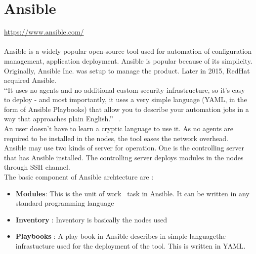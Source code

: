 \section{Ansible}
\url{ https://www.ansible.com/ } \\
\\
Ansible is a widely popular open-source tool used for automation of configuration management,
application deployment. Ansible is popular because of its simplicity. Originally, Ansible Inc.
was setup to manage the product. Later in 2015, RedHat acquired Ansible.\\
‘‘It uses no agents and no additional custom security infrastructure, so it’s easy to deploy - 
and most importantly, it uses a very simple language (YAML, in the form of Ansible Playbooks) 
that allow you to describe your automation jobs in a way that approaches plain English.’’
~\cite {hid-sp18-417-doc-Ansible}. \\
An user doesn’t have to learn a cryptic language to use it. 
As no agents are required to be installed in the nodes, the tool eases the network overhead. \\
Ansible may use two kinds of server for operation. One is the controlling server that has Ansible installed.
The controlling server deploys modules in the nodes through SSH channel. \\
The basic component of Ansible archtecture are : \\
\begin{itemize}
\item       \textbf{Modules}: This is the unit of work \ task in Ansible. It can be written in any standard programming language
\item       \textbf{Inventory} : Inventory is basically the nodes used
\item       \textbf{Playbooks} : A play book in Ansible describes in simple languagethe 
infrastucture used for the deployment of the tool. This is written in YAML.
\end{itemize}


